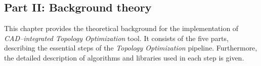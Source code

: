\subsection*{Part II: Background theory}

  \vspace{1mm}

\noindent This chapter provides the theoretical background for the implementation of \textit{CAD--integrated Topology Optimization} tool. It consists of the five parts, describing the essential steps of the \textit{Topology Optimization} pipeline. Furthermore, the detailed description of algorithms and libraries used in each step is given.
\\